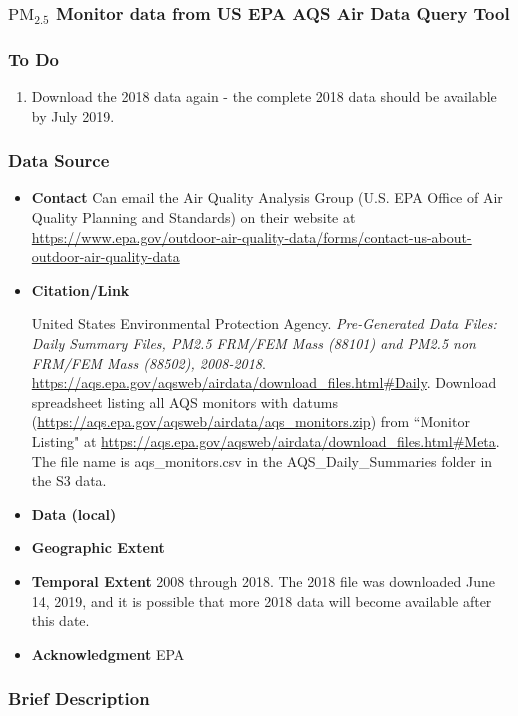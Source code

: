 \subsubsection{$\textrm{PM}_{2.5}$ Monitor data from US EPA AQS Air Data Query Tool}

\subsubsection*{To Do}
\begin{enumerate}
	\item Download the 2018 data again - the complete 2018 data should be available by July 2019.
\end{enumerate}

\subsubsection*{Data Source}

\begin{itemize}[nolistsep]
\item \textbf{Contact} Can email the Air Quality Analysis Group (U.S. EPA Office of Air Quality Planning and Standards) on their website at \url{https://www.epa.gov/outdoor-air-quality-data/forms/contact-us-about-outdoor-air-quality-data}


\item \textbf{Citation/Link}

United States Environmental Protection Agency. \textit{Pre-Generated Data Files: Daily Summary Files, PM2.5 FRM/FEM Mass (88101) and PM2.5 non FRM/FEM Mass (88502), 2008-2018}. \url{https://aqs.epa.gov/aqsweb/airdata/download_files.html#Daily}.  Download spreadsheet listing all AQS monitors with datums (\url{https://aqs.epa.gov/aqsweb/airdata/aqs_monitors.zip}) from ``Monitor Listing" at \url{https://aqs.epa.gov/aqsweb/airdata/download_files.html#Meta}. The file name is aqs\_monitors.csv in the AQS\_Daily\_Summaries folder in the S3 data.
\item \textbf{Data (local)}
\item \textbf{Geographic Extent}
\item \textbf{Temporal Extent}
2008 through 2018. The 2018 file was downloaded June 14, 2019, and it is possible that more 2018 data will become available after this date.
\item \textbf{Acknowledgment} EPA
\end{itemize}



\subsubsection*{Brief Description}

